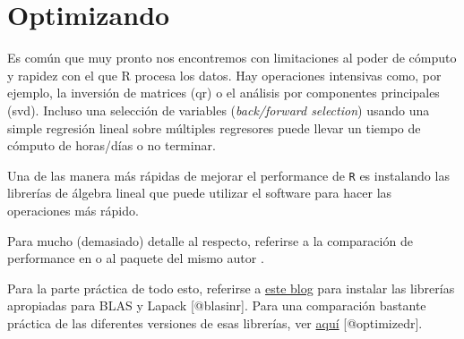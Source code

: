 \documentclass[]{article}
\begin{document}
\section{Optimizando}\label{optimizando}

Es común que muy pronto nos encontremos con limitaciones al poder de
cómputo y rapidez con el que R procesa los datos. Hay operaciones
intensivas como, por ejemplo, la inversión de matrices (qr) o el
análisis por componentes principales (svd). Incluso una selección de
variables (\emph{back/forward selection}) usando una simple regresión
lineal sobre múltiples regresores puede llevar un tiempo de cómputo de
horas/días o no terminar.

Una de las manera más rápidas de mejorar el performance de \texttt{R} es
instalando las librerías de álgebra lineal que puede utilizar el
software para hacer las operaciones más rápido.

Para mucho (demasiado) detalle al respecto, referirse a la comparación
de performance en \textcite{eddelbuettel2010} o al paquete del mismo
autor \textcite{gcbd}.

Para la parte práctica de todo esto, referirse a
\href{http://brettklamer.com/diversions/statistical/faster-blas-in-r/}{este
blog} para instalar las librerías apropiadas para BLAS y Lapack
{[}@blasinr{]}. Para una comparación bastante práctica de las diferentes
versiones de esas librerías, ver
\href{http://blog.nguyenvq.com/blog/2014/11/10/optimized-r-and-python-standard-blas-vs-atlas-vs-openblas-vs-mkl/}{aquí}
{[}@optimizedr{]}.
\end{document}

